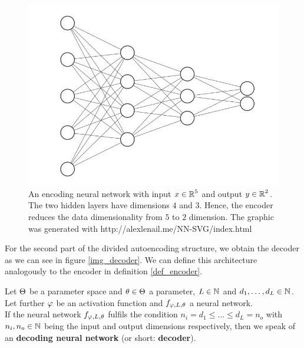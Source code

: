 \begin{figure}[H]
\begin{center}
   \begin{minipage}[b]{0.9\linewidth}
      \includegraphics[width=\linewidth]{encoder}
      \caption{An encoding neural network with input $x\in \operatorname{\mathbb{R}}^5$ and output $y \in \operatorname{\mathbb{R}}^2$. The two hidden layers have dimensions $4$ and $3$. Hence, the encoder reduces the data dimensionality from $5$ to $2$ dimension. The graphic was generated with http://alexlenail.me/NN-SVG/index.html}\label{img_encoder}
	\end{minipage}
\end{center}
\end{figure}


For the second part of the divided autoencoding structure, we obtain the decoder as we can see in figure \ref{img_decoder}. We can define this architecture analogously to the encoder in definition \ref{def_encoder}.


\begin{definition}\label{def_decoder}
Let $\operatorname{\Theta}$ be a parameter space and $\theta \in \operatorname{\Theta}$ a parameter, $L\in \operatorname{\mathbb{N}}$ and $d_1,\ldots, d_L\in\operatorname{\mathbb{N}}$. Let further $\operatorname{\varphi}$ be an activation function and $f_{\operatorname{\varphi},L,\theta}$ a neural network.\\
If the neural network $f_{\operatorname{\varphi},L,\theta}$ fulfils the condition $n_i= d_1 \leq \ldots \leq d_L = n_o$ with $n_i, n_o \in \operatorname{\mathbb{N}}$ being the input and output dimensions respectively, then we speak of an \textbf{decoding neural network} (or short: \textbf{decoder}).
\end{definition}


